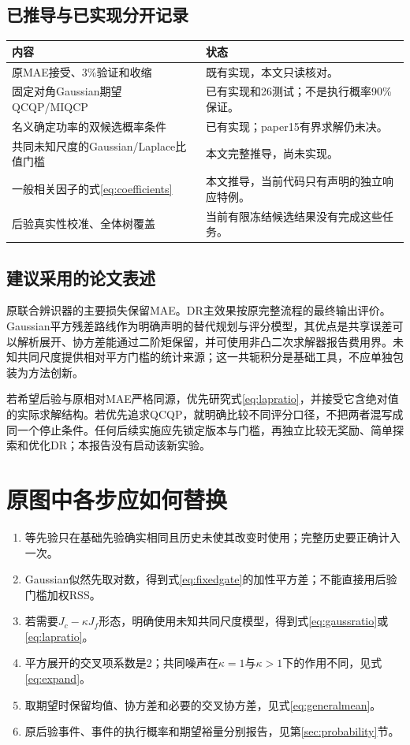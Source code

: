 \documentclass[UTF8,11pt,a4paper,fontset=fandol]{ctexart}
\numberwithin{equation}{section}
\begin{document}
\subsection{已推导与已实现分开记录}
\begin{table}[htbp]\centering\small
\begin{tabularx}{\linewidth}{XX}\toprule
内容&状态\\\midrule
原MAE接受、3\%验证和收缩&既有实现，本文只读核对。\\
固定对角Gaussian期望QCQP/MIQCP&已有实现和26测试；不是执行概率90\%保证。\\
名义确定功率的双候选概率条件&已有实现；paper15有界求解仍未决。\\
共同未知尺度的Gaussian/Laplace比值门槛&本文完整推导，尚未实现。\\
一般相关因子的式\eqref{eq:coefficients}&本文推导，当前代码只有声明的独立响应特例。\\
后验真实性校准、全体树覆盖&当前有限冻结候选结果没有完成这些任务。\\\bottomrule
\end{tabularx}
\end{table}

\subsection{建议采用的论文表述}
原联合辨识器的主要损失保留MAE。DR主效果按原完整流程的最终输出评价。Gaussian平方残差路线作为明确声明的替代规划与评分模型，其优点是共享误差可以解析展开、协方差能通过二阶矩保留，并可使用非凸二次求解器报告费用界。未知共同尺度提供相对平方门槛的统计来源；这一共轭积分是基础工具，不应单独包装为方法创新。

若希望后验与原相对MAE严格同源，优先研究式\eqref{eq:lapratio}，并接受它含绝对值的实际求解结构。若优先追求QCQP，就明确比较不同评分口径，不把两者混写成同一个停止条件。任何后续实施应先锁定版本与门槛，再独立比较无奖励、简单探索和优化DR；本报告没有启动该新实验。

\appendix
\section{原图中各步应如何替换}
\begin{enumerate}[leftmargin=2em]
\item 等先验只在基础先验确实相同且历史未使其改变时使用；完整历史要正确计入一次。
\item Gaussian似然先取对数，得到式\eqref{eq:fixedgate}的加性平方差；不能直接用后验门槛加权RSS。
\item 若需要$J_c-\kappa J_f$形态，明确使用未知共同尺度模型，得到式\eqref{eq:gaussratio}或\eqref{eq:lapratio}。
\item 平方展开的交叉项系数是2；共同噪声在$\kappa=1$与$\kappa>1$下的作用不同，见式\eqref{eq:expand}。
\item 取期望时保留均值、协方差和必要的交叉协方差，见式\eqref{eq:generalmean}。
\item 原后验事件、事件的执行概率和期望裕量分别报告，见第\ref{sec:probability}节。
\end{enumerate}
\end{document}
